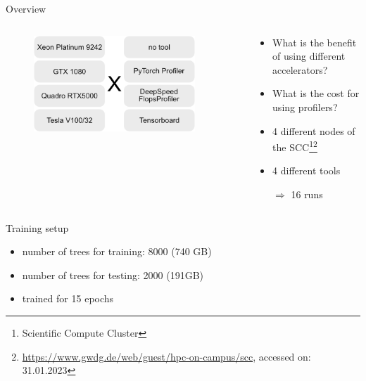 \documentclass[compress,aspectratio=169]{beamer}
\begin{document}
\begin{frame}{Overview}
\begin{columns}
        \begin{column}{0.5\textwidth}
            \centering
            \vspace{-1em}
            \begin{figure}
            \includegraphics[width=0.9\textwidth]{../../data/experiments.png}
            \end{figure}
        \end{column}
        \begin{column}{0.5\textwidth}
            \begin{itemize}
                \item What is the benefit of using different accelerators?
                \item What is the cost for using profilers?
                \vspace{2em}
                \hline
                \vspace{2em}
                \item 4 different nodes of the SCC\footnote{\tiny{Scientific Compute Cluster}}\footnote{\tiny{\url{https://www.gwdg.de/web/guest/hpc-on-campus/scc}}, accessed on: 31.01.2023}
                \item 4 different tools
                \item[$\Rightarrow$] 16 runs
            \end{itemize}
            \vspace{1em}
        \end{column}
    \end{columns}

\end{frame}

\begin{frame}{Training setup}
\begin{itemize}
    \item number of trees for training: 8000 (740 GB)
    \vspace{1em}
    \item number of trees for testing: 2000 (191GB)
    \vspace{1em}
    \item trained for 15 epochs
\end{itemize}
\end{frame}
\end{document}
